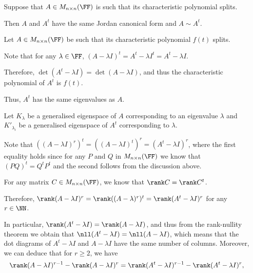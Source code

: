 \documentclass[11pt]{scrartcl}
\begin{document}
\begin{problem*}
  \hfill

  Suppose that $A \in M_{n\times n}(\FF)$ is such that its
  characteristic polynomial splits.

  Then $A$ and $A^t$ have the same Jordan canonical form and
  $A\sim A^t$.


\end{problem*}

\begin{soln}
  \hfill

  Let $A \in M_{n\times n}(\FF)$ be such that its characteristic
  polynomial $f(t)$ splits.

  Note that for any $\lambda\in \FF$,
  $(A-\lambda I)^t = A^t -\lambda I^t = A^t - \lambda I$.

  Therefore, $\det(A^t- \lambda I) = \det (A - \lambda I)$, and thus
  the characteristic polynomial of $A^t$ is $f(t)$.

  Thus, $A^t$ has the same eigenvalues as $A$.


  Let $K_{\lambda}$ be a generalised eigenspace of $A$ corresponding
  to an eigenvalue $\lambda$ and $K'_{\lambda_{i}}$ be a generalised
  eigenspace of $A^t$ corresponding to $\lambda$.


  Note that
  $((A- \lambda I)^r)^t = ((A-\lambda I)^t)^r = (A^t-\lambda I)^r$,
  where the first equality holds since for any $P$ and $Q$ in
  $M_{n\times n}(\FF)$ we know that $(PQ)^t = Q^tP^t$ and the second
  follows from the discussion above.

  For any matrix $C \in M_{n\times n}(\FF)$, we know that
  $\rank C = \rank C^t$.

  Therefore,
  $\rank (A-\lambda I)^r = \rank ((A-\lambda)^{r})^t = \rank
  (A^t-\lambda I)^r$ for any $r\in\NN$.

  In particular, $\rank (A^t-\lambda I) = \rank (A-\lambda I)$, and
  thus from the rank-nullity theorem we obtain that
  $\nll (A^t-\lambda I) = \nll (A-\lambda I)$, which means that the
  dot diagrams of $A^t-\lambda I$ and $A-\lambda I$ have the same
  number of columns. Moreover, we can deduce that for $r \geq 2$, we
  have 
  \[\rank(A-\lambda I)^{r-1} - \rank (A-\lambda I)^r = \rank (A^t-\lambda I)^{r-1} - \rank (A^t- \lambda I)^r,\] 


\end{soln}
\end{document}
